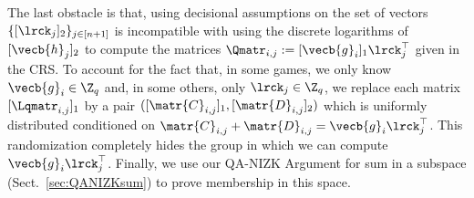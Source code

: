 The last obstacle is that, 
  using decisional assumptions on the set of vectors 
  $\{[\lrck_{j}]_2\}_{j\in[n+1]}$ is incompatible with using the discrete logarithms of $[\vecb{h}_j]_2$ to compute the matrices $\Qmatr_{i,j}:=[\vecb{g}_i]_1 \lrck_j^{\top}$ given in the CRS. 
To account for the fact that, in some games,
  we only know $\vecb{g}_i \in \Z_q$ and, in some others,
  only $\lrck_j \in \Z_q$, we replace each matrix 
  $[\Lqmatr_{i,j}]_1$ by a pair 
  $([\matr{C}_{i,j}]_1,[\matr{D}_{i,j}]_2)$ which is uniformly 
  distributed conditioned on 
  $\matr{C}_{i,j}+\matr{D}_{i,j}=\vecb{g}_i \lrck_j^{\top}$.
This randomization completely hides the group in which we can compute 
  $\vecb{g}_i \lrck_j^{\top}$. 
  Finally, we use our QA-NIZK Argument for sum in a subspace (Sect.\ \ref{sec:QANIZKsum}) to prove membership in this space.

